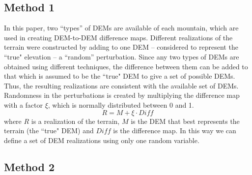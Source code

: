 \documentclass[12pt]{article}
\begin{document}
\subsection{Method 1} \label{Method1}
In this paper, two ``types'' of DEMs are available of each mountain,
which are used in creating DEM-to-DEM difference maps.  Different
realizations of the terrain were constructed by adding to one DEM --
considered to represent the ``true" elevation -- a ``random''
perturbation.  Since any two types of DEMs are obtained using
different techniques, the difference between them can be added to that
which is assumed to be the ``true" DEM to give a set of possible
DEMs. Thus, the resulting realizations are consistent with the
available set of DEMs. Randomness in the perturbations is created by
multiplying the difference map with a factor $\xi$, which is normally distributed between 0 and 1.
\begin{equation}
R = M + \xi \cdot Diff
\label{eq:two}
\end{equation}
where $R$ is a realization of the terrain, $M$ is the DEM that best
represents the terrain (the ``true" DEM) and $Diff$ is the difference map. 
In this way we can define a set
of DEM realizations using only one random variable.

\subsection{Method 2}
\label{Method2}

\end{document}
